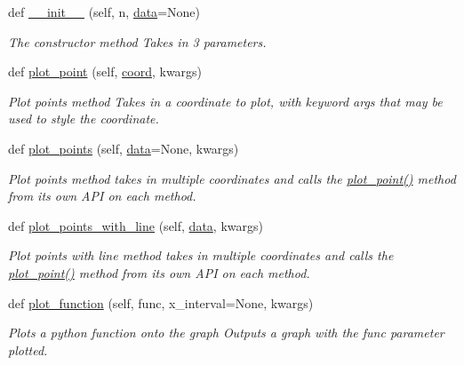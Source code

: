 \begin{DoxyCompactItemize}
\item 
def \hyperlink{class_graph_1_1_graph_af0cdc046d29cdf27c5f94445132d7cd8}{\+\_\+\+\_\+init\+\_\+\+\_\+} (self, n, \hyperlink{class_graph_1_1_graph_a94a0ef0f03a0dd24dea82e3ef2b7d6e1}{data}=None)
\begin{DoxyCompactList}\small\item\em The constructor method Takes in 3 parameters. \end{DoxyCompactList}\item 
def \hyperlink{class_graph_1_1_graph_ad52308b6029d41678a23df1f40baa81e}{plot\+\_\+point} (self, \hyperlink{namespace_graph_af7871e2e7cce2b271673d8be423ba0d1}{coord}, kwargs)
\begin{DoxyCompactList}\small\item\em Plot points method Takes in a coordinate to plot, with keyword args that may be used to style the coordinate. \end{DoxyCompactList}\item 
def \hyperlink{class_graph_1_1_graph_ad01b52cd4d978eb49b257b2af5caffc0}{plot\+\_\+points} (self, \hyperlink{class_graph_1_1_graph_a94a0ef0f03a0dd24dea82e3ef2b7d6e1}{data}=None, kwargs)
\begin{DoxyCompactList}\small\item\em Plot points method takes in multiple coordinates and calls the \hyperlink{class_graph_1_1_graph_ad52308b6029d41678a23df1f40baa81e}{plot\+\_\+point()} method from its own A\+PI on each method. \end{DoxyCompactList}\item 
def \hyperlink{class_graph_1_1_graph_ae10db019dca4a470d6c03b86984fc667}{plot\+\_\+points\+\_\+with\+\_\+line} (self, \hyperlink{class_graph_1_1_graph_a94a0ef0f03a0dd24dea82e3ef2b7d6e1}{data}, kwargs)
\begin{DoxyCompactList}\small\item\em Plot points with line method takes in multiple coordinates and calls the \hyperlink{class_graph_1_1_graph_ad52308b6029d41678a23df1f40baa81e}{plot\+\_\+point()} method from its own A\+PI on each method. \end{DoxyCompactList}\item 
def \hyperlink{class_graph_1_1_graph_a2a9994035c4419c6ff72d675ef85823c}{plot\+\_\+function} (self, func, x\+\_\+interval=None, kwargs)
\begin{DoxyCompactList}\small\item\em Plots a python function onto the graph Outputs a graph with the func parameter plotted. \end{DoxyCompactList}\end{DoxyCompactItemize}
